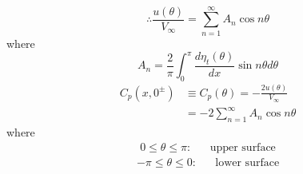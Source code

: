 \begin{itemize}
\begin{align*}
\end{align*}
\begin{equation}
\therefore\frac{u(\theta)}{V_\infty} = \sum_{n=1}^\infty A_n\cos n\theta
\end{equation}
where
\[
A_n = \frac{2}{\pi}\int_0^\pi\frac{d\eta_t(\theta)}{dx}\sin n\theta d\theta
\]
\begin{align}
C_p(x,0^{\pm})
&\equiv C_p(\theta)  = -\frac{2u(\theta)}{V_\infty} \nonumber\\
&= -2\sum_{n=1}^\infty A_n\cos n\theta\label{eq: 6-2-21}
\end{align}
where
\begin{align*}
0\leq\theta\leq \pi\colon && \text{upper surface}
\end{align*}
\begin{align*}
-\pi\leq\theta\leq 0\colon && \text{lower surface}
\end{align*}
\end{itemize}
